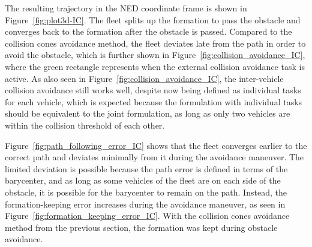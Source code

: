 The resulting trajectory in the NED coordinate frame is shown in Figure~\ref{fig:plot3d-IC}. The fleet splits up the formation to pass the obstacle and converges back to the formation after the obstacle is passed. Compared to the collision cones avoidance method, the fleet deviates late from the path in order to avoid the obstacle, which is further shown in Figure~\ref{fig:collision_avoidance_IC}, where the green rectangle represents when the external collision avoidance task is active. As also seen in Figure~\ref{fig:collision_avoidance_IC}, the inter-vehicle collision avoidance still works well, despite now being defined as individual tasks for each vehicle, which is expected because the formulation with individual tasks should be equivalent to the joint formulation, as long as only two vehicles are within the collision threshold of each other.

Figure~\ref{fig:path_following_error_IC} shows that the fleet converges earlier to the correct path and deviates minimally from it during the avoidance maneuver. The limited deviation is possible because the path error is defined in terms of the barycenter, and as long as some vehicles of the fleet are on each side of the obstacle, it is possible for the barycenter to remain on the path. Instead, the formation-keeping error increases during the avoidance maneuver, as seen in Figure~\ref{fig:formation_keeping_error_IC}. With the collision cones avoidance method from the previous section, the formation was kept during obstacle avoidance. 

